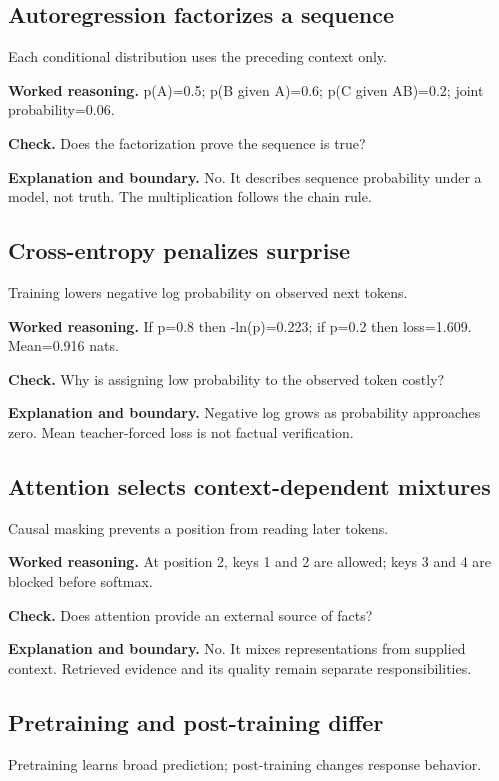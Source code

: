 \subsection{Autoregression factorizes a sequence}
Each conditional distribution uses the preceding context only.

\textbf{Worked reasoning.} p(A)=0.5; p(B given A)=0.6; p(C given AB)=0.2; joint probability=0.06.

\textbf{Check.} Does the factorization prove the sequence is true?

\textbf{Explanation and boundary.} No. It describes sequence probability under a model, not truth. The multiplication follows the chain rule.

\subsection{Cross-entropy penalizes surprise}
Training lowers negative log probability on observed next tokens.

\textbf{Worked reasoning.} If p=0.8 then -ln(p)=0.223; if p=0.2 then loss=1.609. Mean=0.916 nats.

\textbf{Check.} Why is assigning low probability to the observed token costly?

\textbf{Explanation and boundary.} Negative log grows as probability approaches zero. Mean teacher-forced loss is not factual verification.

\subsection{Attention selects context-dependent mixtures}
Causal masking prevents a position from reading later tokens.

\textbf{Worked reasoning.} At position 2, keys 1 and 2 are allowed; keys 3 and 4 are blocked before softmax.

\textbf{Check.} Does attention provide an external source of facts?

\textbf{Explanation and boundary.} No. It mixes representations from supplied context. Retrieved evidence and its quality remain separate responsibilities.

\subsection{Pretraining and post-training differ}
Pretraining learns broad prediction; post-training changes response behavior.

